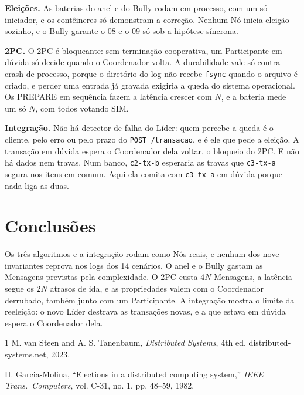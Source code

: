 \documentclass[conference]{IEEEtran}
\newcommand{\cod}[1]{\texttt{\upshape #1}}
\begin{document}
\textbf{Eleições.} As baterias do anel e do Bully rodam em processo, com um só iniciador, e os
contêineres só demonstram a correção. Nenhum Nó inicia eleição sozinho, e o Bully garante o 08 e
o 09 só sob a hipótese síncrona.

\textbf{2PC.} O 2PC é bloqueante: sem terminação cooperativa, um Participante em dúvida só decide
quando o Coordenador volta. A durabilidade vale só contra crash de processo, porque o diretório do log
não recebe \cod{fsync} quando o arquivo é criado, e perder uma entrada já gravada exigiria a queda
do sistema operacional. Os PREPARE em sequência fazem a latência crescer com $N$, e a bateria
mede um só $N$, com todos votando SIM.

\textbf{Integração.} Não há detector de falha do Líder: quem percebe a queda é o cliente, pelo erro
ou pelo prazo do \cod{POST /transacao}, e é ele que pede a eleição. A transação em dúvida espera o
Coordenador dela voltar, o bloqueio do 2PC. E não há
dados nem travas. Num banco, \cod{c2-tx-b} esperaria as travas que \cod{c3-tx-a} segura nos itens
em comum. Aqui ela comita com \cod{c3-tx-a} em dúvida porque nada liga as duas.

\section{Conclusões}
\label{sec:conclusao}
Os três algoritmos e a integração rodam como Nós reais, e nenhum dos nove invariantes reprova nos
logs dos 14 cenários. O anel e o Bully gastam as Mensagens previstas pela complexidade. O 2PC custa $4N$ Mensagens, a latência segue os $2N$ atrasos de ida, e as
propriedades valem com o Coordenador derrubado, também junto com um Participante. A integração
mostra o limite da reeleição: o novo Líder destrava as transações novas, e a que estava em dúvida
espera o Coordenador dela.

\clearpage
\begin{thebibliography}{1}
M. van Steen and A. S. Tanenbaum, \emph{Distributed Systems}, 4th ed.
distributed-systems.net, 2023.

H. Garcia-Molina, ``Elections in a distributed computing system,'' \emph{IEEE Trans.\
Computers}, vol. C-31, no. 1, pp. 48--59, 1982.
\end{thebibliography}
\end{document}

